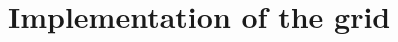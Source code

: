 \documentclass{beamer}
\newcommand{\be}[1]{\begin{equation} \label{#1}}
\newcommand{\ee}{\end{equation}}
\newcommand{\difp}[2]{\frac{\partial #1}{\partial #2}}
\newcommand{\bz}{{\bf z}}
\newcommand{\bx}{{\bf x}}
\newcommand{\rd}{{\rm d}}
\begin{document}
%

\section{Implementation of the grid}
\end{document}
